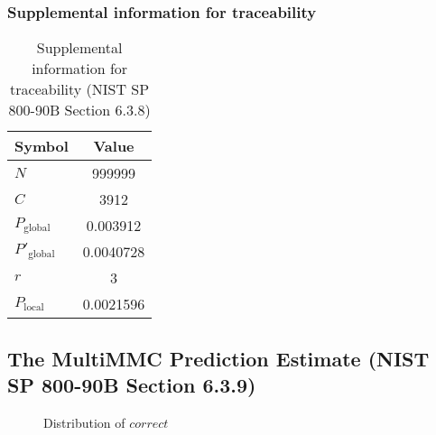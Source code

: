 \documentclass[a3paper,xelatex,english]{bxjsarticle}
\begin{document}
\subsubsection{Supplemental information for traceability}
\renewcommand{\arraystretch}{1.8}
\begin{table}[h]
\caption{Supplemental information for traceability (NIST SP 800-90B Section 6.3.8)}
\begin{center}
\begin{tabular}{|l|c|}
\hline 
\rowcolor{anotherlightblue} %
Symbol				& Value \\ \hline 
$N$				& 999999\\ \hline 
$C$				& 3912\\ \hline 
$P_{\textrm{global}}$				& 0.003912\\ \hline 
$P'_{\textrm{global}}$			& 0.0040728\\ \hline 
$r$				& 3\\ \hline 
$P_{\textrm{local}}$ 			& 0.0021596\\ \hline
\end{tabular}
\end{center}
\end{table}
\renewcommand{\arraystretch}{1.4}
\clearpage
\subsection{The MultiMMC Prediction Estimate (NIST SP 800-90B Section 6.3.9)}\label{sec:NonBinary639}

\begin{figure}[htbp]
\centering

\caption{Distribution of $correct$}
\end{figure}
\end{document}
